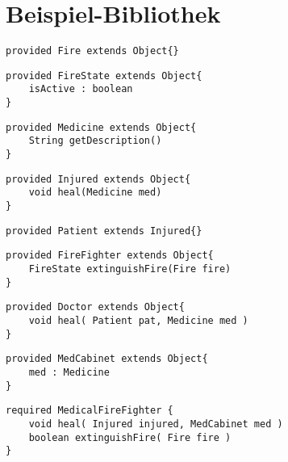 \documentclass[a4paper,12pt]{article}
\begin{document}
\newpage
\section{Beispiel-Bibliothek}

\begin{lstlisting}[style = dsl]
provided Fire extends Object{}
\end{lstlisting}

\begin{lstlisting}[style = dsl]
provided FireState extends Object{
	isActive : boolean
}
\end{lstlisting}

 \begin{lstlisting}[style = dsl]
provided Medicine extends Object{
	String getDescription()
}
\end{lstlisting}

\begin{lstlisting}[style = dsl]
provided Injured extends Object{
	void heal(Medicine med)	
}
\end{lstlisting}


\begin{lstlisting}[style = dsl]
provided Patient extends Injured{}
\end{lstlisting}
\begin{lstlisting}[style = dsl]
provided FireFighter extends Object{
	FireState extinguishFire(Fire fire)
}
\end{lstlisting}

\begin{lstlisting}[style = dsl]
provided Doctor extends Object{	
	void heal( Patient pat, Medicine med )
}
\end{lstlisting}



\begin{lstlisting}[style = dsl]
provided MedCabinet extends Object{
	med : Medicine
}
\end{lstlisting}

\begin{lstlisting}[caption={Bibliothek von Typen},captionpos=b, style = dsl]
required MedicalFireFighter {
	void heal( Injured injured, MedCabinet med )
	boolean extinguishFire( Fire fire )	
}
\end{lstlisting}

\newpage
\end{document}

